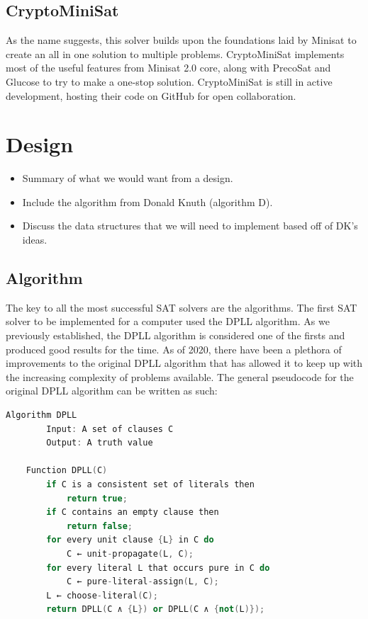 \documentclass{article}
\begin{document}
\subsection{CryptoMiniSat}
As the name suggests, this solver builds upon the foundations laid by Minisat to create an all in
one solution to multiple problems. CryptoMiniSat implements most of the useful features from Minisat
2.0 core, along with PrecoSat and Glucose to try to make a one-stop solution. CryptoMiniSat is still
in active development, hosting their code on GitHub for open collaboration.


\section{Design}
\begin{itemize}
    \item Summary of what we would want from a design.
    \item Include the algorithm from Donald Knuth (algorithm D).
    \item Discuss the data structures that we will need to implement based off of DK's ideas.
\end{itemize}

\subsection{Algorithm}
The key to all the most successful SAT solvers are the algorithms. The first SAT solver to be implemented for a computer used the DPLL algorithm. As we previously established, the DPLL algorithm is considered one of the firsts and produced good results for the time. As of 2020, there have been a plethora of improvements to the original DPLL algorithm that has allowed it to keep up with the increasing complexity of problems available. The general pseudocode for the original DPLL algorithm can be written as such:

\begin{lstlisting}[language=C++]
    Algorithm DPLL
        Input: A set of clauses C
        Output: A truth value

    Function DPLL(C)
        if C is a consistent set of literals then
            return true;
        if C contains an empty clause then
            return false;
        for every unit clause {L} in C do
            C ← unit-propagate(L, C);
        for every literal L that occurs pure in C do
            C ← pure-literal-assign(L, C);
        L ← choose-literal(C);
        return DPLL(C ∧ {L}) or DPLL(C ∧ {not(L)});

\end{lstlisting}
\end{document}
